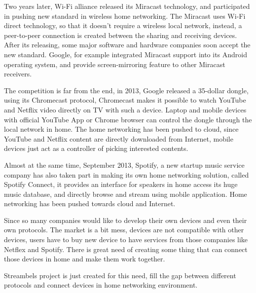 Two years later, Wi-Fi alliance released its Miracast technology, and participated in pushing new standard in wireless home networking. The Miracast uses Wi-Fi direct technology, so that it doesn't require a wireless local network, instead, a peer-to-peer connection is created between the sharing and receiving devices. After its releasing, some major software and hardware companies soon accept the new standard. Google, for example integrated Miracast support into its Android operating system, and provide screen-mirroring feature to other Miracast receivers.

The competition is far from the end, in 2013, Google released a 35-dollar dongle, using its Chromecast protocol, Chromecast makes it possible to watch YouTube and Netflix video directly on TV with such a device. Laptop and mobile devices with official YouTube App or Chrome browser can control the dongle through the local network in home. The home networking has been pushed to cloud, since YouTube and Netflix content are directly downloaded from Internet, mobile devices just act as a controller of picking interested contents. 

Almost at the same time, September 2013, Spotify, a new startup music service company has also taken part in making its own home networking solution, called Spotify Connect, it provides an interface for speakers in home access its huge music database, and directly browse and stream using mobile application. Home networking has been pushed towards cloud and Internet.

Since so many companies would like to develop their own devices and even their own protocols. The market is a bit mess, devices are not compatible with other devices, users have to buy new device to have services from those companies like Netflex and Spotify. There is great need of creating some thing that can connect those devices in home and make them work together. 

Streambels project is just created for this need, fill the gap between different protocols and connect devices in home networking environment.



